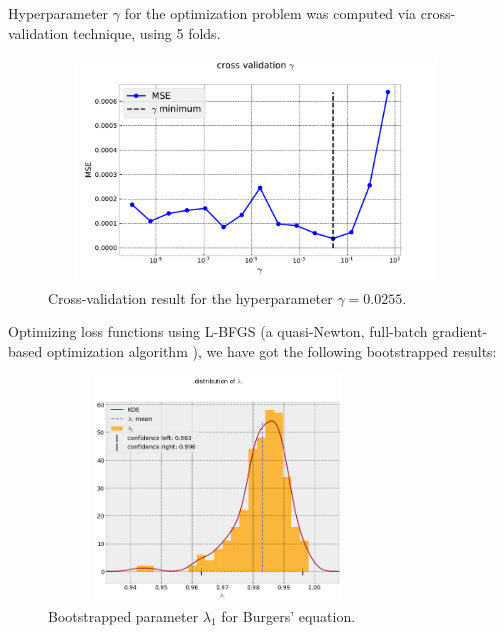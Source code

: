 \documentclass{beamer}
\begin{document}
\begin{frame}

Hyperparameter $\gamma$ for the optimization problem was computed via cross-validation technique, using 5 folds. 
\begin{figure}
    \centering
    \includegraphics[width=11cm, height=6cm]{02-presentation-v1/images/cross_val_gamma.pdf}
    \caption{Cross-validation result for the hyperparameter $\gamma = 0.0255$.}
    \label{fig:my_label}
\end{figure}
    
\end{frame}

\begin{frame}

Optimizing loss functions using L-BFGS (a quasi-Newton, full-batch gradient-based optimization algorithm \cite{Liu1989Nocedal}), we have got the following bootstrapped results:
\begin{figure}
\centering
\includegraphics[width = 9cm , height = 6cm]{02-presentation-v1/images/bootstraped_l1.png}
\caption{Bootstrapped parameter $\lambda_1$ for Burgers' equation.}
\end{figure}

\end{frame}
\end{document}
